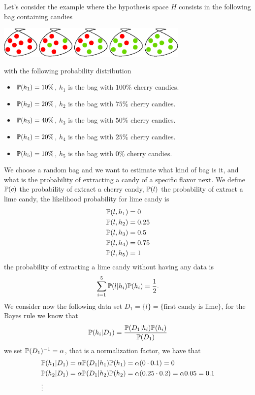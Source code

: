 \documentclass[10pt, letterpaper]{report}
\begin{document}
Let's consider the example where the hypothesis space $H$ consists in the following bag containing candies\begin{center}
	\includegraphics[width=0.7\textwidth]{images/candies.eps}
\end{center}
with the following probability distribution\begin{itemize}
	\item ${\mathbb P}(h_1)=10\%$, $h_1$ is the bag with $100\%$ cherry candies.
	\item ${\mathbb P}(h_2)=20\%$, $h_2$ is the bag with $75\%$ cherry candies.
	\item ${\mathbb P}(h_3)=40\%$, $h_3$ is the bag with $50\%$ cherry candies.
	\item ${\mathbb P}(h_4)=20\%$, $h_4$ is the bag with $25\%$ cherry candies.
	\item ${\mathbb P}(h_5)=10\%$, $h_5$ is the bag with $0\%$ cherry candies.
\end{itemize}
We choose a random bag and we want to estimate what kind of bag is it, and what is the probability of extracting a candy of a specific flavor next. We define ${\mathbb P}(c)$ the probability of extract a cherry candy, ${\mathbb P}(l)$ the probability of extract a lime candy,  the likelihood probability for lime candy is\begin{align*}
	 & {\mathbb P}(l,h_1)=0    \\
	 & {\mathbb P}(l,h_2)=0.25 \\
	 & {\mathbb P}(l,h_3)=0.5  \\
	 & {\mathbb P}(l,h_4)=0.75 \\
	 & {\mathbb P}(l,h_5)=1
\end{align*}
the probability of extracting a lime candy without having any data is\begin{equation}
	\sum_{i=1}^5{\mathbb P}(l|h_i){\mathbb P}(h_i)=\frac{1}{2}.
\end{equation}
We consider now the following data set $D_1=\{l\}=\{\text{first candy is lime}\}$, for the Bayes rule we know that\begin{equation}
	{\mathbb P}(h_i|D_1)=\frac{{\mathbb P}(D_1|h_i){\mathbb P}(h_i)}{{\mathbb P}(D_1)}
\end{equation}
we set ${\mathbb P}(D_1)^{-1}=\alpha$, that is a normalization factor, we have that\begin{align*}
	 & {\mathbb P}(h_1|D_1)=\alpha{\mathbb P}(D_1|h_1){\mathbb P}(h_1)=\alpha(0\cdot 0.1)=0                 \\
	 & {\mathbb P}(h_2|D_1)=\alpha{\mathbb P}(D_1|h_2){\mathbb P}(h_2)=\alpha(0.25\cdot 0.2)=\alpha0.05=0.1 \\
	 & \vdots
\end{align*}
\end{document}

